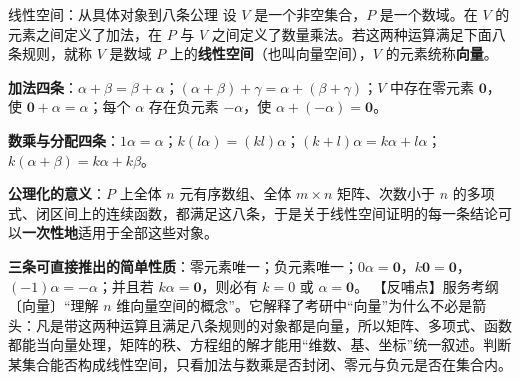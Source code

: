 
\begin{fdeep}{线性空间：从具体对象到八条公理}
设 $V$ 是一个非空集合，$P$ 是一个数域。在 $V$ 的元素之间定义了加法，在 $P$ 与 $V$ 之间定义了数量乘法。若这两种运算满足下面八条规则，就称 $V$ 是数域 $P$ 上的\textbf{线性空间}（也叫向量空间），$V$ 的元素统称\textbf{向量}。

\textbf{加法四条}：$\alpha+\beta=\beta+\alpha$；$(\alpha+\beta)+\gamma=\alpha+(\beta+\gamma)$；$V$ 中存在零元素 $\mathbf{0}$，使 $\mathbf{0}+\alpha=\alpha$；每个 $\alpha$ 存在负元素 $-\alpha$，使 $\alpha+(-\alpha)=\mathbf{0}$。

\textbf{数乘与分配四条}：$1\alpha=\alpha$；$k(l\alpha)=(kl)\alpha$；$(k+l)\alpha=k\alpha+l\alpha$；$k(\alpha+\beta)=k\alpha+k\beta$。

\textbf{公理化的意义}：$P$ 上全体 $n$ 元有序数组、全体 $m\times n$ 矩阵、次数小于 $n$ 的多项式、闭区间上的连续函数，都满足这八条，于是关于线性空间证明的每一条结论可以\textbf{一次性地}适用于全部这些对象。

\textbf{三条可直接推出的简单性质}：零元素唯一；负元素唯一；$0\alpha=\mathbf{0}$，$k\mathbf{0}=\mathbf{0}$，$(-1)\alpha=-\alpha$；并且若 $k\alpha=\mathbf{0}$，则必有 $k=0$ 或 $\alpha=\mathbf{0}$。
【反哺点】服务考纲〔向量〕“理解 $n$ 维向量空间的概念”。它解释了考研中“向量”为什么不必是箭头：凡是带这两种运算且满足八条规则的对象都是向量，所以矩阵、多项式、函数都能当向量处理，矩阵的秩、方程组的解才能用“维数、基、坐标”统一叙述。判断某集合能否构成线性空间，只看加法与数乘是否封闭、零元与负元是否在集合内。
\end{fdeep}

